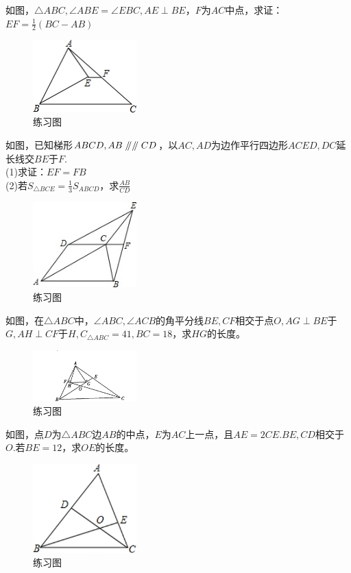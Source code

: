 \documentclass{ecnuthesis}
\newcommand\px{\mathrel{/\mkern-5mu/}}  %
\begin{document}
\begin{problem}
    如图，$\triangle ABC,\angle ABE=\angle EBC,AE\perp BE$，$F$为$AC$中点，求证：$EF=\frac{1}{2}(BC-AB)$
\end{problem}
\begin{figure}[H]
\centering
\includegraphics[width=4cm]{picture/604.png}
\caption{练习图}
\end{figure}
\begin{problem}
    如图，已知梯形$ABCD,AB\px\px CD$，以$AC,AD$为边作平行四边形$ACED,DC$延长线交$BE$于$F$. \\
    (1)求证：$EF=FB$ \\
    (2)若$S_{\triangle BCE}=\frac{1}{3}S_{ABCD}$，求$\frac{AB}{CD}$
\end{problem}
\begin{figure}[H]
\centering
\includegraphics[width=4cm]{picture/697.jpg}
\caption{练习图}
\end{figure}
\begin{problem}
    如图，在$\triangle ABC$中，$\angle ABC,\angle ACB$的角平分线$BE,CF$相交于点$O,AG\perp BE$于$G,AH\perp CF$于$H,C_{\triangle ABC}=41,BC=18$，求$HG$的长度。
\end{problem}
\begin{figure}[H]
\centering
\includegraphics[width=4cm]{picture/698.png}
\caption{练习图}
\end{figure}
\begin{problem}
    如图，点$D$为$\triangle ABC$边$AB$的中点，$E$为$AC$上一点，且$AE=2CE.BE,CD$相交于$O$.若$BE=12$，求$OE$的长度。
\end{problem}
\begin{figure}[H]
\centering
\includegraphics[width=4cm]{picture/699.png}
\caption{练习图}
\end{figure}
\end{document}
